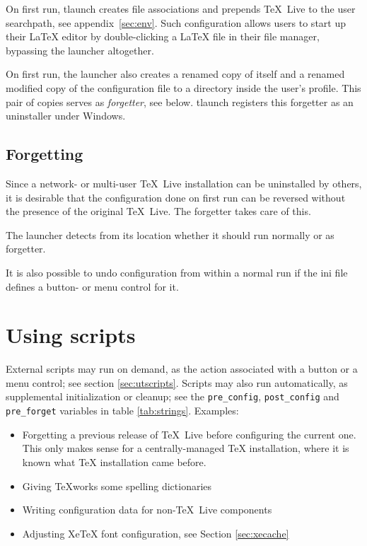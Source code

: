 \documentclass[11pt,a4paper,oneside]{report}
\def\TL{\TeX~Live}
\def\XeTeX{Xe\TeX}
\begin{document}
On first run, tlaunch creates file associations and prepends \TL{} to
the user searchpath, see appendix~\ref{sec:env}. Such configuration
allows users to start up their \LaTeX{} editor by double-clicking a
\LaTeX{} file in their file manager, bypassing the launcher
altogether.

On first run, the launcher also creates a renamed copy of itself and
a renamed modified copy of the configuration file to a directory
inside the user's profile. This pair of copies serves as
\emph{forgetter}, see below. tlaunch registers this forgetter as an
uninstaller under Windows.

\subsection{Forgetting}
\label{sec:forget}

Since a network- or multi-user \TL{} installation can be uninstalled
by others, it is desirable that the configuration done on first run
can be reversed without the presence of the original \TL{}. The
forgetter takes care of this.

The launcher detects from its location whether it should run normally
or as forgetter.

It is also possible to undo configuration from within a normal run
if the ini file defines a button- or menu control for it.

\section{Using scripts}
\label{sec:scripts}

External scripts may run on demand, as the action associated with a
button or a menu control; see section \ref{sec:utscripts}. Scripts
may also run automatically, as supplemental initialization or
cleanup; see the \texttt{pre\_config}, \texttt{post\_config} and
\texttt{pre\_forget} variables in table \ref{tab:strings}. Examples:
\begin{itemize}
\item Forgetting a previous release of \TL{} before configuring the
  current one. This only makes sense for a centrally-managed \TeX{}
  installation, where it is known what \TeX{} installation came
  before.
  \item Giving \TeX works some spelling dictionaries
  \item Writing configuration data for non-\TL{} components
  \item Adjusting \XeTeX{} font configuration, see Section
    \ref{sec:xecache}
\end{itemize}
\end{document}
